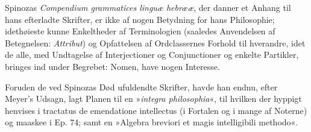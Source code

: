 \documentclass[12pt,a4paper]{book}
\newcommand{\opage}[1]{\marginnote{\footnotesize\textit{[#1]}}}
\begin{document}
\opage{41} Spinozas \emph{Compendium grammatices linguæ hebrææ}, der danner et
Anhang til hans efterladte Skrifter, er ikke af nogen Betydning for hans
Philosophie; idethøieste kunne Enkeltheder af Terminologien (saaledes
Anvendelsen af Betegnelsen: \emph{Attribut}) og Opfattelsen af
Ordclassernes Forhold til hverandre, idet de alle, med Undtagelse af
Interjectioner og Conjunctioner og enkelte Partikler, bringes ind under
Begrebet: Nomen, have nogen Interesse.

Foruden de ved Spinozas Død ufuldendte Skrifter, havde han endnu, efter
Meyer's Udsagn, lagt Planen til en »\emph{integra philosophia}«, til
hvilken der hyppigt henvises i tractatus de emendatione intellectus (i
Fortalen og i mange af Noterne) og maaskee i Ep. 74; samt en »Algebra
breviori et magis intelligibili methodo«.
\end{document}
